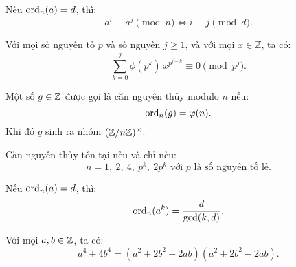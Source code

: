 \documentclass[../imo-training-open-book.tex]{subfiles}
\begin{document}
\vspace{1em}

\begin{lemma}
    \label{lemma:order-preserved}
    Nếu \( \operatorname{ord}_n(a) = d \), thì:
    \[
        a^i \equiv a^j \pmod{n} \iff i \equiv j \pmod{d}.
    \]
\end{lemma}

\vspace{1em}

\begin{lemma}
    \label{lemma:euler-power-sum-mod}
    Với mọi số nguyên tố \( p \) và số nguyên \( j \ge 1 \), và với mọi \( x \in \mathbb{Z} \), ta có:
    \[
        \sum_{k = 0}^{j} \phi\left(p^k\right)\, x^{p^{j - k}} \equiv 0 \pmod{p^j}.
    \]
\end{lemma}

\vspace{1em}

\begin{definition}
    \label{definition:primitive-root}
    Một số \( g \in \mathbb Z \) được gọi là căn nguyên thủy modulo \( n \) nếu:
    \[
        \operatorname{ord}_n(g) = \varphi(n).
    \]
    Khi đó \( g \) sinh ra nhóm \( (\mathbb Z/n\mathbb Z)^\times \).
\end{definition}

\vspace{1em}

\begin{theorem}
    \label{theorem:existence-primitive-root}
    Căn nguyên thủy tồn tại nếu và chỉ nếu:
    \[
        n = 1,\ 2,\ 4,\ p^k,\ 2p^k \text{ với } p \text{ là số nguyên tố lẻ}.
    \]
\end{theorem}

\vspace{1em}

\begin{lemma}
    \label{lemma:order-of-power}
    Nếu \( \operatorname{ord}_n(a) = d \), thì:
    \[
        \operatorname{ord}_n(a^k) = \frac{d}{\gcd(k, d)}.
    \]
\end{lemma}

\vspace{1em}

\begin{theorem}
    \label{theorem:sophie-germain-identity}
    Với mọi \( a, b \in \mathbb Z \), ta có:
    \[
        a^4 + 4b^4 = (a^2 + 2b^2 + 2ab)(a^2 + 2b^2 - 2ab).
    \]
\end{theorem}
\end{document}
